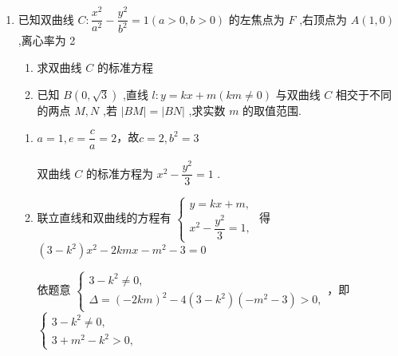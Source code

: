 \begin{enumerate}
\begin{enumerate}
\begin{jieda}
\begin{enumerate}
\begin{dingautolist}{172}
                    则 ${x}_{1} + {x}_{2} =  - \dfrac{8km}{4{k}^{2} - 1} =  - \dfrac{8km}{{m}^{2}} =  - \dfrac{8k}{m}$ ,则 ${x}_{M} = \dfrac{{x}_{1} + {x}_{2}}{2} =  - \dfrac{4k}{m}$
                    
                    则 ${x}_{M}^{2} = \dfrac{{16}{k}^{2}}{{m}^{2}} = 4 + \dfrac{4}{{m}^{2}} > 4$，即 $|{x}_{M}| > 2$（事实上$x_M$为正），此时点 $M$ 到 $y$ 轴的距离大于 2 .
                \end{dingautolist}
                综上所述，点 $M$ 到 $y$ 轴的最小距离为 2 .
            \end{enumerate}
        \end{jieda}
        \item  已知双曲线 $C : \dfrac{{x}^{2}}{{a}^{2}} - \dfrac{{y}^{2}}{{b}^{2}} = 1\left( {a > 0,b > 0}\right)$ 的左焦点为 $F$ ,右顶点为 $A\left( {1,0}\right)$ ,离心率为 2
        \begin{enumerate}
            \item 求双曲线 $C$ 的标准方程
            \item 已知 $B\left( {0,\sqrt{3}}\right)$ ,直线 $l : y = {kx} + m\left( {{km} \neq  0}\right)$ 与双曲线 $C$ 相交于不同的两点 $M,N$ ,若 $\left| {BM}\right|  = \left| {BN}\right|$ ,求实数 $m$ 的取值范围.
        \end{enumerate}
        \begin{jieda}
            \begin{enumerate}
                \item $a = 1, e=\dfrac{c}{a} = 2$，故$c = 2,{b}^{2} = 3$

                双曲线 $C$ 的标准方程为 ${x}^{2} - \dfrac{{y}^{2}}{3} = 1$ .

                \item 
                联立直线和双曲线的方程有 $\left\{  \begin{array}{l} y = {kx} + m, \\  {x}^{2} - \dfrac{{y}^{2}}{3} = 1, \end{array}\right. $ 得 $\left( {3 - {k}^{2}}\right) {x}^{2} - {2kmx} - {m}^{2} - 3 = 0$ 
                
                依题意 $\left\{  \begin{array}{l} 3 - {k}^{2} \neq  0, \\  \Delta  = {\left( -2km\right) }^{2} - 4\left( {3 - {k}^{2}}\right) \left( {-{m}^{2} - 3}\right)  > 0, \end{array}\right.$，即 $\left\{  \begin{array}{l} 3 - {k}^{2} \neq  0, \\  3 + {m}^{2} - {k}^{2} > 0, \end{array}\right.$
                

\end{enumerate}
\end{jieda}
\end{enumerate}
\end{enumerate}
